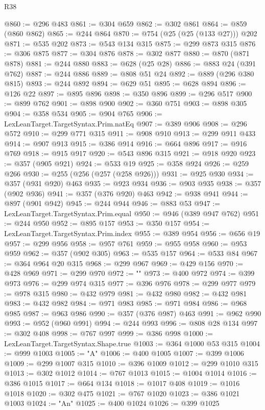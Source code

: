 \begin{lexlean}{R38}
\begin{coremodule}
@860 := @296 @483
@861 := @304 @659
@862 := @302 @861
@864 := @859 (@860 @862)
@865 := @244 @864
@870 := @754 (@25 (@25 (@133 @27))) @202
@871 := @535 @202
@873 := @543 @134 @315
@875 := @299 @873 @315
@876 := @306 @875
@877 := @304 @876
@878 := @302 @877
@880 := @870 (@871 @878)
@881 := @244 @880
@883 := @628 (@25 @28)
@886 := @883 @24 (@391 @762)
@887 := @244 @886
@889 := @808 @51 @24
@892 := @889 (@296 @380 @815)
@893 := @244 @892
@894 := @629 @51
@895 := @628 @894
@896 := @126 @22
@897 := @895 @896
@898 := @350 @896
@899 := @296 @517
@900 := @899 @762
@901 := @898 @900
@902 := @360 @751
@903 := @898 @305
@904 := @358 @534
@905 := @904 @765
@906 := LexLeanTarget.TargetSyntax.Prim.natEq
@907 := @389 @906
@908 := @296 @572
@910 := @299 @771 @315
@911 := @908 @910
@913 := @299 @911 @433
@914 := @907 @913
@915 := @386 @914
@916 := @664 @896
@917 := @916 @769
@918 := @915 @917
@920 := @543 @896 @315
@921 := @918 @920
@923 := @357 (@905 @921)
@924 := @533 @19
@925 := @358 @924
@926 := @259 @266
@930 := @255 (@256 (@257 (@258 @926)))
@931 := @925 @930
@934 := @357 (@931 @920) @463
@935 := @923 @934
@936 := @903 @935
@938 := @357 (@902 @936)
@941 := @357 (@376 @920) @463
@942 := @938 @941
@944 := @897 (@901 @942)
@945 := @244 @944
@946 := @883 @53
@947 := LexLeanTarget.TargetSyntax.Prim.equal
@950 := @946 (@389 @947 @762)
@951 := @244 @950
@952 := @895 @157
@953 := @350 @157
@954 := LexLeanTarget.TargetSyntax.Prim.index
@955 := @389 @954
@956 := @656 @19
@957 := @299 @956
@958 := @957 @761
@959 := @955 @958
@960 := @953 @959
@962 := @357 (@902 @305)
@963 := @535 @157
@964 := @533 @84
@967 := @364 @964 @20 @315
@968 := @299 @967
@969 := @429 @156
@970 := @428 @969
@971 := @299 @970
@972 := ""
@973 := @400 @972
@974 := @399 @973
@976 := @299 @974 @315
@977 := @396 @976
@978 := @299 @977
@979 := @978 @315
@980 := @432 @979
@981 := @432 @980
@982 := @432 @981
@983 := @432 @982
@984 := @971 @983
@985 := @971 @984
@986 := @968 @985
@987 := @963 @986
@990 := @357 (@376 @987) @463
@991 := @962 @990
@993 := @952 (@960 @991)
@994 := @244 @993
@996 := @808 @28 @134
@997 := @302 @408
@998 := @767 @997
@999 := @386 @998
@1000 := LexLeanTarget.TargetSyntax.Shape.true
@1003 := @364 @1000 @53 @315
@1004 := @999 @1003
@1005 := "A"
@1006 := @400 @1005
@1007 := @399 @1006
@1009 := @299 @1007 @315
@1010 := @396 @1009
@1012 := @299 @1010 @315
@1013 := @302 @1012
@1014 := @767 @1013
@1015 := @1004 @1014
@1016 := @386 @1015
@1017 := @664 @134
@1018 := @1017 @408
@1019 := @1016 @1018
@1020 := @302 @475
@1021 := @767 @1020
@1023 := @386 @1021 @1003
@1024 := "An"
@1025 := @400 @1024
@1026 := @399 @1025

\end{coremodule}
\end{lexlean}
